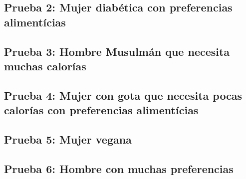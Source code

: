 \documentclass[12]{article}
\begin{document}
\subsection{Prueba 2: Mujer diabética con preferencias alimentícias}


\subsection{Prueba 3: Hombre Musulmán que necesita muchas calorías}


\subsection{Prueba 4: Mujer con gota que necesita pocas calorías con preferencias alimentícias}


\subsection{Prueba 5: Mujer vegana}


\subsection{Prueba 6: Hombre con muchas preferencias}
\end{document}
